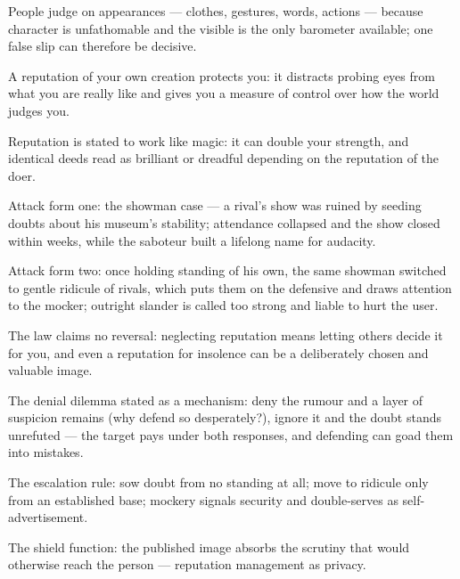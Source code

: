 

\begin{distilled}
  \item People judge on appearances --- clothes, gestures, words, actions --- because character is unfathomable and the visible is the only barometer available; one false slip can therefore be decisive.
  \item A reputation of your own creation protects you: it distracts probing eyes from what you are really like and gives you a measure of control over how the world judges you.
  \item Reputation is stated to work like magic: it can double your strength, and identical deeds read as brilliant or dreadful depending on the reputation of the doer.
  \item Attack form one: the showman case --- a rival's show was ruined by seeding doubts about his museum's stability; attendance collapsed and the show closed within weeks, while the saboteur built a lifelong name for audacity.
  \item Attack form two: once holding standing of his own, the same showman switched to gentle ridicule of rivals, which puts them on the defensive and draws attention to the mocker; outright slander is called too strong and liable to hurt the user.
  \item The law claims no reversal: neglecting reputation means letting others decide it for you, and even a reputation for insolence can be a deliberately chosen and valuable image.
\end{distilled}

\begin{unique}
  \item The denial dilemma stated as a mechanism: deny the rumour and a layer of suspicion remains (why defend so desperately?), ignore it and the doubt stands unrefuted --- the target pays under both responses, and defending can goad them into mistakes.
  \item The escalation rule: sow doubt from no standing at all; move to ridicule only from an established base; mockery signals security and double-serves as self-advertisement.
  \item The shield function: the published image absorbs the scrutiny that would otherwise reach the person --- reputation management as privacy.
\end{unique}
